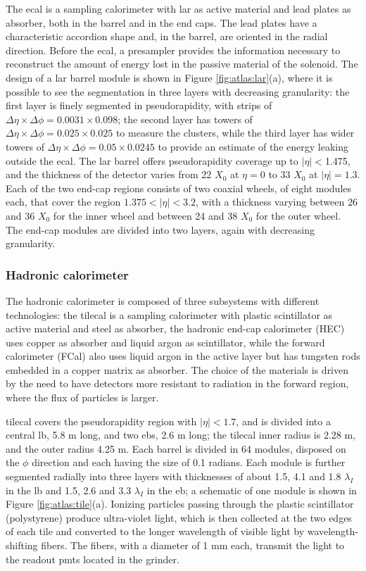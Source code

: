 The \gls{ecal} is a sampling calorimeter with \gls{lar} as active material and lead plates as absorber, both in the barrel and in the end caps. The lead plates have a characteristic accordion shape and, in the barrel, are oriented in the radial direction. Before the \gls{ecal}, a presampler provides the information necessary to reconstruct the amount of energy lost in the passive material of the solenoid. The design of a \gls{lar} barrel module is shown in Figure \ref{fig:atlas:lar}(a), where it is possible to see the segmentation in three layers with decreasing granularity: the first layer is finely segmented in pseudorapidity, with strips of $\Delta\eta \times \Delta\phi = 0.0031 \times 0.098$; the second layer has towers of $\Delta\eta \times \Delta\phi =  0.025 \times 0.025$ to measure the clusters, while the third layer has wider towers of $\Delta\eta \times \Delta\phi =  0.05 \times 0.0245$ to provide an estimate of the energy leaking outside the \gls{ecal}. The \gls{lar} barrel offers pseudorapidity coverage up to $|\eta|<$1.475, and the thickness of the detector varies from 22 $X_0$ at $\eta=0$ to 33 $X_0$ at $|\eta|=1.3$. 
Each of the two end-cap regions consists of two coaxial wheels, of eight modules each, that cover the region $1.375<|\eta|<3.2$, with a thickness varying between 26 and 36 $X_0$ for the inner wheel and between 24 and 38 $X_0$ for the outer wheel. The end-cap modules are divided into two layers, again with decreasing granularity.


\subsubsection*{Hadronic calorimeter}

The hadronic calorimeter is composed of three subsystems with different technologies: the \gls{tilecal} \cite{TileTDR} is a sampling calorimeter with plastic scintillator as active material and steel as absorber, the hadronic end-cap calorimeter (HEC) uses copper as absorber and liquid argon as scintillator, while the forward calorimeter (FCal) also uses liquid argon in the active layer but has tungsten rods embedded in a copper matrix as absorber. The choice of the materials is driven by the need to have detectors more resistant to radiation in the forward region, where the flux of particles is larger. 

\gls{tilecal} covers the pseudorapidity region with $|\eta|<1.7$, and is divided into a central \gls{lb}, 5.8 m long, and two \glspl{eb}, 2.6 m long; the \gls{tilecal} inner radius is 2.28 m, and the outer radius 4.25 m. Each barrel is divided in 64 modules, disposed on the $\phi$ direction and each having the size of 0.1 radians. Each module is further segmented radially into three layers with thicknesses of about 1.5, 4.1 and 1.8 $\lambda_I$ in the \gls{lb} and 1.5, 2.6 and 3.3 $\lambda_I$ in the \gls{eb}; a schematic of one module is shown in Figure \ref{fig:atlas:tile}(a). Ionizing particles passing through the plastic scintillator (polystyrene) produce ultra-violet light, which is then collected at the two edges of each tile and converted to the longer wavelength of visible light by wavelength-shifting fibers. The fibers, with a diameter of 1 mm each, transmit the light to the readout \glspl{pmt} located in the grinder.

